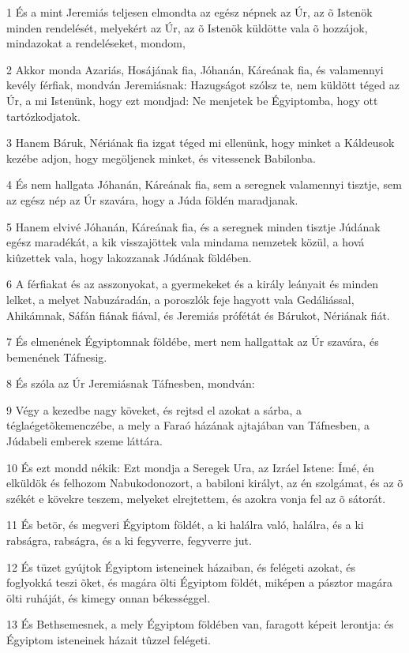 \par 1 És a mint Jeremiás teljesen elmondta az egész népnek az Úr, az õ Istenök minden rendelését, melyekért az Úr, az õ Istenök küldötte vala õ hozzájok, mindazokat a rendeléseket, mondom,
\par 2 Akkor monda Azariás, Hosájának fia, Jóhanán, Káreának fia, és valamennyi kevély férfiak, mondván Jeremiásnak: Hazugságot szólsz te, nem küldött téged az Úr, a mi Istenünk, hogy ezt mondjad: Ne menjetek be Égyiptomba, hogy ott tartózkodjatok.
\par 3 Hanem Báruk, Nériának fia izgat téged mi ellenünk, hogy minket a Káldeusok kezébe adjon, hogy megöljenek minket, és vitessenek Babilonba.
\par 4 És nem hallgata Jóhanán, Káreának fia, sem a seregnek valamennyi tisztje, sem az egész nép az Úr szavára, hogy a Júda földén maradjanak.
\par 5 Hanem elvivé Jóhanán, Káreának fia, és a seregnek minden tisztje Júdának egész maradékát, a kik visszajöttek vala mindama nemzetek közül, a hová kiûzettek vala, hogy lakozzanak Júdának földében.
\par 6 A férfiakat és az asszonyokat, a gyermekeket és a király leányait és minden lelket, a melyet Nabuzáradán, a poroszlók feje hagyott vala Gedáliással, Ahikámnak, Sáfán fiának fiával, és Jeremiás prófétát és Bárukot, Nériának fiát.
\par 7 És elmenének Égyiptomnak földébe, mert nem hallgattak az Úr szavára, és bemenének Táfnesig.
\par 8 És szóla az Úr Jeremiásnak Táfnesben, mondván:
\par 9 Végy a kezedbe nagy köveket, és rejtsd el azokat a sárba, a téglaégetõkemenczébe, a mely a Faraó házának ajtajában van Táfnesben, a Júdabeli emberek szeme láttára.
\par 10 És ezt mondd nékik: Ezt mondja a Seregek Ura, az Izráel Istene: Ímé, én elküldök és felhozom  Nabukodonozort, a babiloni királyt, az én szolgámat, és az õ székét e kövekre teszem, melyeket elrejtettem, és azokra vonja fel az õ sátorát.
\par 11 És betör, és megveri Égyiptom földét, a ki halálra való, halálra, és a ki rabságra, rabságra, és a ki fegyverre, fegyverre jut.
\par 12 És tüzet gyújtok Égyiptom isteneinek házaiban, és felégeti azokat, és foglyokká teszi õket, és magára ölti Égyiptom földét, miképen a pásztor magára ölti ruháját, és kimegy onnan békességgel.
\par 13 És Bethsemesnek, a mely Égyiptom földében van, faragott képeit lerontja: és Égyiptom isteneinek házait tûzzel felégeti.

